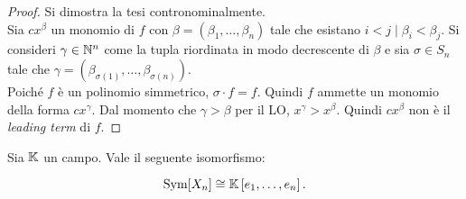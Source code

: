 \documentclass[11pt]{scrbook}
\begin{document}
\begin{proof}
    Si dimostra la tesi contronominalmente. \\
    
    Sia $c x^\beta$ un monomio di $f$ con $\beta = (\beta_1, \ldots, \beta_n)$ tale che esistano $i < j
    \mid \beta_i < \beta_j$. Si consideri $\gamma \in \mathbb N^n$ come
    la tupla riordinata in modo decrescente di $\beta$ e sia
    $\sigma \in S_n$ tale che $\gamma = (\beta_{\sigma(1)},
    \ldots, \beta_{\sigma(n)})$. \\
    
    Poiché $f$ è un polinomio simmetrico, $\sigma \cdot f = f$. Quindi
    $f$ ammette un monomio della forma $c x^\gamma$. Dal momento
    che $\gamma > \beta$ per il LO, $x^\gamma > x^\beta$. Quindi
    $c x^\beta$ non è il \textit{leading term} di $f$.
\end{proof}

\begin{theorem}
    Sia $\mathbb{K}$ un campo. Vale il seguente isomorfismo:
    
    \[ \operatorname{Sym}[X_n] \cong \mathbb{K}\left[e_1, \ldots, e_n\right]. \]
\end{theorem}
\end{document}
